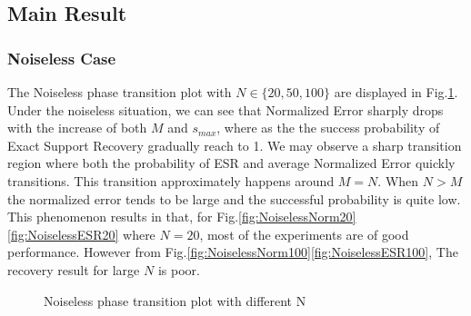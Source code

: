 \documentclass{ucsdreport}
\begin{document}
\subsection{Main Result}
\subsubsection{Noiseless Case}
The Noiseless phase transition plot with $N\in \{20,50,100\}$ are displayed in Fig.\ref{fig:Noiseless}. Under the noiseless situation, we can see that Normalized Error sharply drops with the increase of both $M$ and $s_{max}$, where as the the success probability of Exact Support Recovery gradually reach to 1. We may observe a sharp transition region where both the probability of ESR and average Normalized Error quickly transitions. This transition approximately happens around $M=N$. When $N>M$ the normalized error tends to be large and the successful probability is quite low. This phenomenon results in that, for Fig.\ref{fig:NoiselessNorm20}\ref{fig:NoiselessESR20} where $N=20$, most of the experiments are of good performance. However from Fig.\ref{fig:NoiselessNorm100}\ref{fig:NoiselessESR100}, The recovery result for large $N$ is poor.
\begin{figure}[h]
    \centering
    \caption{Noiseless phase transition plot with different N}
    \label{fig:Noiseless}
\end{figure}
\end{document}

